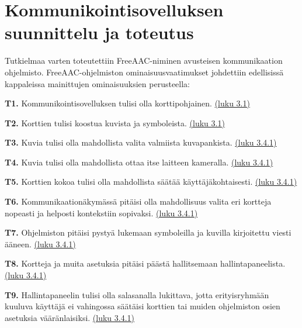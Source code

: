 \documentclass[utf8]{gradu3}
\begin{document}
\chapter{Kommunikointisovelluksen suunnittelu ja toteutus}

Tutkielmaa varten toteutettiin FreeAAC-niminen avusteisen kommunikaation ohjelmisto. FreeAAC-ohjelmiston ominaisuusvaatimukset johdettiin edellisissä kappaleissa mainittujen ominaisuuksien perusteella:

\begin{description}
\item \textbf{T1.} Kommunikointisovelluksen tulisi olla korttipohjainen. \hyperref[AAC-cards]{(luku 3.1)}

\item \textbf{T2.} Korttien tulisi koostua kuvista ja symboleista. \hyperref[AAC-symbols]{(luku 3.1)}

\item \textbf{T3.} Kuvia tulisi olla mahdollista valita valmiista kuvapankista. \hyperref[symbol-libraries]{(luku 3.4.1)}

\item \textbf{T4.} Kuvia tulisi olla mahdollista ottaa itse laitteen kameralla. \hyperref[AAC-photos]{(luku 3.4.1)}

\item \textbf{T5.} Korttien kokoa tulisi olla mahdollista säätää käyttäjäkohtaisesti. \hyperref[AAC-cardsize]{(luku 3.4.1)}

\item \textbf{T6.} Kommunikaationäkymässä pitäisi olla mahdollisuus valita eri kortteja nopeasti ja helposti kontekstiin sopivaksi. \hyperref[AAC-cardsize]{(luku 3.4.1)}

\item \textbf{T7.} Ohjelmiston pitäisi pystyä lukemaan symboleilla ja kuvilla kirjoitettu viesti ääneen. \hyperref[AAC-soundsynth]{(luku 3.4.1)}

\item \textbf{T8.} Kortteja ja muita asetuksia pitäisi päästä hallitsemaan hallintapaneelista. \hyperref[AAC-settings]{(luku 3.4.1)}

\item \textbf{T9.} Hallintapaneelin tulisi olla salasanalla lukittava, jotta erityisryhmään kuuluva käyttäjä ei vahingossa säätäisi korttien tai muiden ohjelmiston osien asetuksia vääränlaisiksi. \hyperref[AAC-settings]{(luku 3.4.1)}
\end{description}
\end{document}
